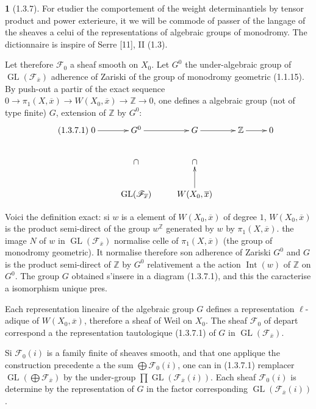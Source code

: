 \documentclass[12pt,a4paper]{article}
\theoremstyle{plain}
\theoremstyle{definition}
\theoremstyle{definition}
\newtheorem{para}{}[section]
\theoremstyle{remark}
\DeclareMathOperator{\GL}{GL}
\DeclareMathOperator{\Int}{Int}
\begin{document}
\begin{para}[1.3.7]
For etudier the comportement of the weight determinantiels by tensor product and power exterieure, it we will be commode of passer of the langage of the sheaves a celui of the representations of algebraic groups of monodromy. The dictionnaire is inspire of Serre [11], II (1.3).

Let therefore $\mathscr{F}_0$ a sheaf smooth on $X_0$. Let $G^0$ the under-algebraic group of $\GL(\mathscr{F}_{\overline{x}})$ adherence of Zariski of the group of monodromy geometric (1.1.15). By push-out a partir of the exact sequence $0 \to \pi_1(X, \overline{x}) \to W(X_0, \overline{x}) \to \mathbb{Z} \to 0$, one defines a algebraic group (not of type finite) $G$, extension of $\mathbb{Z}$ by $G^0$:
\begin{equation}\tag{1.3.7.1}
\xymatrix{
0 \ar[r] & G^0 \ar[r] & G \ar[r] & \mathbb{Z} \ar[r] & 0 \\
& \cap & \cap \\
& \GL(\mathscr{F}_{\overline{x}}) & W(X_0, \overline{x}) \ar[u]
}
\end{equation}

Voici the definition exact: si $w$ is a element of $W(X_0, \overline{x})$ of degree $1$, $W(X_0, \overline{x})$ is the product semi-direct of the group $w^{\mathbb{Z}}$ generated by $w$ by $\pi_1(X, \overline{x})$. the image $N$ of $w$ in $\GL(\mathscr{F}_{\overline{x}})$ normalise celle of $\pi_1(X, \overline{x})$ (the group of monodromy geometric). It normalise therefore son adherence of Zariski $G^0$ and $G$ is the product semi-direct of $\mathbb{Z}$ by $G^0$ relativement a the action $\Int(w)$ of $\mathbb{Z}$ on $G^0$. The group $G$ obtained s'insere in a diagram (1.3.7.1), and this the caracterise a isomorphism unique pres.

Each representation lineaire of the algebraic group $G$ defines a representation $\ell$-adique of $W(X_0, \overline{x})$, therefore a sheaf of Weil on $X_0$. The sheaf $\mathscr{F}_0$ of depart correspond a the representation tautologique (1.3.7.1) of $G$ in $\GL(\mathscr{F}_{\overline{x}})$.

Si $\mathscr{F}_0(i)$ is a family finite of sheaves smooth, and that one applique the construction precedente a the sum $\bigoplus \mathscr{F}_0(i)$, one can in (1.3.7.1) remplacer $\GL(\bigoplus \mathscr{F}_{\overline{x}})$ by the under-group $\prod \GL(\mathscr{F}_{\overline{x}}(i))$. Each sheaf $\mathscr{F}_0(i)$ is determine by the representation of $G$ in the factor corresponding $\GL(\mathscr{F}_{\overline{x}}(i))$.
\end{para}
\end{document}

